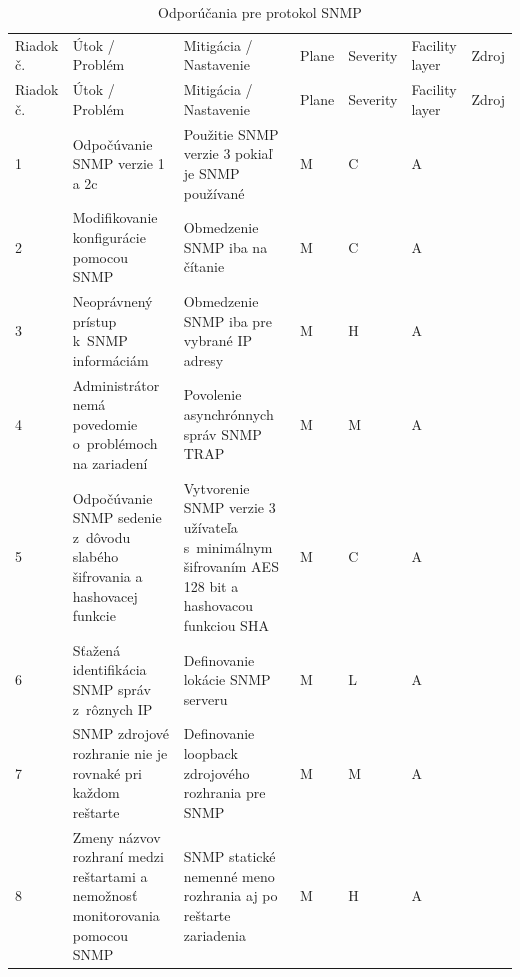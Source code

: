 \begin{longtable}[!htbp]{|C{2.5em}L{11em}L{11em}C{2.5em}C{4em}C{5em}L{2.5em}|}
	
	\caption{Odporúčania pre protokol SNMP}
	\label{tab:snmp}\\ \hline
	\mbox{Riadok} č.&Útok / Problém	&Mitigácia / Nastavenie	&Plane	&Severity	&Facility layer	&Zdroj\\ \hhline{=======}
	\endfirsthead 
	\hline
	\centering
	
	Riadok č.	&Útok / Problém	&Mitigácia / Nastavenie	&Plane	&Severity	&Facility layer	&Zdroj\\ \hhline{=======}
	\endhead
	
	 1	&Odpočúvanie SNMP verzie 1 a 2c	&Použitie SNMP verzie 3 pokiaľ je SNMP používané	&M	&C	&A	& \cite{CIS_DrTLsgXv24lxeIIM}
	
	\cite{Graesser2001}\\
	2	&Modifikovanie konfigurácie pomocou SNMP	&Obmedzenie SNMP iba na čítanie	&M	&C	&A	& \cite{CIS_DrTLsgXv24lxeIIM}
	
	\cite{Graesser2001}
	
	\cite{Akin2002}\\
	 3	&Neoprávnený prístup k~SNMP informáciám	&Obmedzenie SNMP iba pre vybrané IP adresy	&M	&H	&A	& \cite{CIS_DrTLsgXv24lxeIIM}
	
	\cite{Graesser2001}\\
	4	&Administrátor nemá povedomie o~problémoch na zariadení	&Povolenie asynchrónnych správ SNMP TRAP	&M	&M	&A	& \cite{CIS_DrTLsgXv24lxeIIM}
	
	\cite{Graesser2001}
	
	\cite{Akin2002}\\
	 5	&Odpočúvanie SNMP sedenie z~dôvodu slabého šifrovania a hashovacej  funkcie	&Vytvorenie SNMP verzie 3 užívateľa s~minimálnym šifrovaním AES 128 bit a hashovacou funkciou SHA	&M	&C	&A	& \cite{Barker2019}
	
	\cite{CIS_DrTLsgXv24lxeIIM}
	
	\cite{Akin2002}\\
	6	&Sťažená identifikácia SNMP správ z~rôznych IP	&Definovanie lokácie SNMP serveru	&M	&L	&A	& \cite{Dooley2007}\\
	 7	&SNMP zdrojové rozhranie nie je rovnaké pri každom reštarte	& Definovanie loopback zdrojového rozhrania pre SNMP	&M	&M	&A	& \cite{CIS_DrTLsgXv24lxeIIM}\\
	8	&Zmeny názvov rozhraní medzi reštartami a nemožnosť monitorovania pomocou SNMP	&SNMP statické nemenné meno rozhrania aj po reštarte zariadenia	&M	&H	&A	& \cite{Dooley2007}\\
	
	\hline
\end{longtable}%
